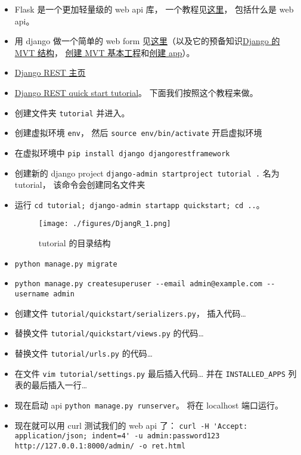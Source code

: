 

\begin{issues}
\issueDraft
\end{issues}

\begin{itemize}
\item Flask 是一个更加轻量级的 web api 库， 一个教程见\href{https://programminghistorian.org/en/lessons/creating-apis-with-python-and-flask}{这里}， 包括什么是 web api。
\item 用 django 做一个简单的 web form 见\href{https://www.geeksforgeeks.org/how-to-create-a-form-using-django-forms/}{这里}（以及它的预备知识\href{https://www.geeksforgeeks.org/django-project-mvt-structure}{Django 的 MVT 结构}， \href{https://www.geeksforgeeks.org/how-to-create-a-basic-project-using-mvt-in-django/}{创建 MVT 基本工程}和\href{https://www.geeksforgeeks.org/how-to-create-an-app-in-django/}{创建 app}）。
\item \href{https://www.django-rest-framework.org/}{Django REST 主页}
\item \href{https://www.django-rest-framework.org/tutorial/quickstart/}{Django REST quick start tutorial}。 下面我们按照这个教程来做。
\item 创建文件夹 \verb|tutorial| 并进入。
\item 创建虚拟环境 \verb|env|， 然后 \verb|source env/bin/activate| 开启虚拟环境
\item 在虚拟环境中 \verb|pip install django djangorestframework|
\item 创建新的 django project \verb|django-admin startproject tutorial .| 名为 tutorial， 该命令会创建同名文件夹
\item 运行 \verb|cd tutorial; django-admin startapp quickstart; cd ..|。
\begin{figure}[ht]
\centering
\texttt{[image: ./figures/DjangR\_1.png]}
\caption{tutorial 的目录结构} \label{DjangR_fig1}
\end{figure}
\item \verb|python manage.py migrate|
\item \verb|python manage.py createsuperuser --email admin@example.com --username admin|
\item 创建文件 \verb|tutorial/quickstart/serializers.py|， 插入代码…
\item 替换文件 \verb|tutorial/quickstart/views.py| 的代码…
\item 替换文件 \verb|tutorial/urls.py| 的代码…
\item 在文件 \verb|vim tutorial/settings.py| 最后插入代码… 并在 \verb|INSTALLED_APPS| 列表的最后插入一行…
\item 现在启动 api \verb|python manage.py runserver|。 将在 localhost 端口运行。
\item 现在就可以用 curl 测试我们的 web api 了： \verb|curl -H 'Accept: application/json; indent=4' -u admin:password123 http://127.0.0.1:8000/admin/ -o ret.html|
\end{itemize}
